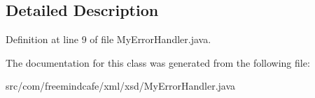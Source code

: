 \subsection{Detailed Description}


Definition at line 9 of file My\+Error\+Handler.\+java.



The documentation for this class was generated from the following file\+:\begin{DoxyCompactItemize}
\item 
src/com/freemindcafe/xml/xsd/My\+Error\+Handler.\+java\end{DoxyCompactItemize}
